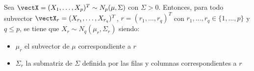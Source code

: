     \begin{ncor}[Marginalización]
      Sea $\vectX = (X_1,\dots,X_p)^T \sim N_p(\mu,\Sigma)$ con $\Sigma > 0$. Entonces, para todo subvector $\vectX_r = (X_{r_1},\dots, X_{r_q})^T$, $r = (r_1,\dots,r_q)^T$ con $r_1,\dots,r_q \in \{1,\dots,p\}$ y $q \leq p$, se tiene que $X_r \sim N_q(\mu_r, \Sigma_r)$ siendo:
      \begin{itemize}
      \item $\mu_r$ el subvector de $\mu$ correspondiente a $r$
        \item $\Sigma_r$ la submatriz de $\Sigma$ definida por las filas y columnas correspondientes a $r$
      \end{itemize}
    \end{ncor}
